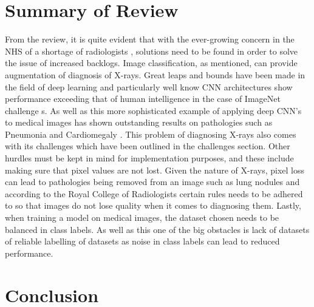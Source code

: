 \section{Summary of Review}

From the review, it is quite evident that with the ever-growing concern in the NHS of a shortage of radiologists \cite{rimmer2017radiologist}, solutions need to be found in order to solve the issue of increased backlogs. Image classification, as mentioned, can provide augmentation of diagnosis of X-rays. Great leaps and bounds have been made in the field of deep learning and particularly well know CNN architectures show performance exceeding that of human intelligence in the case of ImageNet challenge \cite{krizhevsky2012imagenet}s. As well as this more sophisticated example of applying deep CNN's to medical images has shown outstanding results on pathologies such as Pneumonia and Cardiomegaly \cite{rajpurkar2017chexnet}. This problem of diagnosing X-rays also comes with its challenges which have been outlined in the challenges section. Other hurdles must be kept in mind for implementation purposes, and these include making sure that pixel values are not lost. Given the nature of X-rays, pixel loss can lead to pathologies being removed from an image such as lung nodules and according to the Royal  College of Radiologists certain rules needs to be adhered to so that images do not lose quality when it comes to diagnosing them. Lastly, when training a model on medical images, the dataset chosen needs to be balanced in class labels. As well as this one of the big obstacles is lack of datasets of reliable labelling of datasets as noise in class labels can lead to reduced performance. 


\section{Conclusion}

